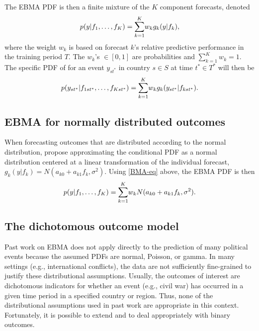\documentclass[pdftex,12pt,fullpage,oneside]{amsart}
\begin{document}
The EBMA PDF is then a finite mixture of the $K$ component forecasts,
denoted
\begin{equation}
\small
\label{BMA-eq}
p(y|f_1, \ldots, f_K)=\overset{K}{\underset{k=1}{\sum}} w_k
g_k(y|f_k),
\end{equation}
 \noindent where the weight $w_k$ is based on forecast $k$'s relative
predictive performance in the training period $T$. The $w_k$'s $\in
[0,1]$ are probabilities and $\sum_{k=1}^Kw_k=1$.  The specific PDF of
for an event $y_{st^*}$ in country $s\in S$ at time $t^* \in T^*$ will
then be
\begin{equation}
\label{BMA-eq2}
\small
p(y_{st^*}|f_{1st^*}, \ldots,
f_{Kst^*})=\overset{K}{\underset{k=1}{\sum}} w_k
g_k(y_{st^*}|f_{kst^*}).
\end{equation}

\subsection{EBMA for normally distributed outcomes}

When forecasting outcomes that are distributed according to the normal
distribution, \citet{Raftery:2005} propose approximating the
conditional PDF as a normal distribution centered at a linear
transformation of the individual forecast, $g_k(y|f_k) = N(a_{k0} + a_{k1}f_k,
\sigma^2)$.  Using \eqref{BMA-eq} above, the EBMA PDF is then
\begin{equation} \small
p(y|f_1, \ldots, f_K) = \overset{K}{\underset{k=1}{\sum}} w_k N(a_{k0} +
a_{k1}f_k, \sigma^2).
\end{equation}

\subsection{The dichotomous outcome model}

Past work on EBMA does not apply directly to the prediction of many
political events because the assumed PDFs are normal, Poisson, or
gamma. In many  settings (e.g., international conflicts), the data
are not sufficiently fine-grained to justify these distributional
assumptions.  Usually, the outcomes of interest are dichotomous
indicators for whether an event (e.g., civil war) has occurred in a
given time period in a specified country or region. Thus, none of the
distributional assumptions used in past work are appropriate in this
context.  Fortunately, it is possible to extend \citet{Sloughter:2007}
and \citet{Sloughter:2010} to deal appropriately with binary outcomes.
\end{document}
